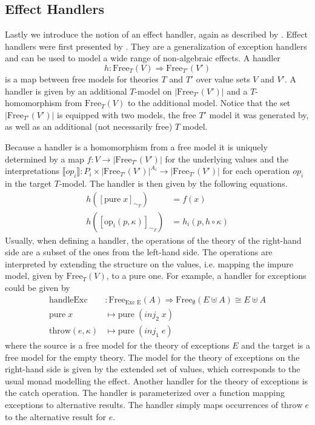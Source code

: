 \subsection{Effect Handlers}
\label{preliminaries:handler}

Lastly we introduce the notion of an effect handler, again as described by
\textcite{DBLP:journals/corr/abs-1807-05923}.
Effect handlers were first presented by \textcite{DBLP:conf/esop/PlotkinP09}.
They are a generalization of exception handlers and can be used to model a wide
range of non-algebraic effects.
A handler
\[
  h : \mathrm{Free}_{T}(V) \Rightarrow \mathrm{Free}_{T'}(V')
\]
is a map between free models for theories $T$ and $T'$ over value sets $V$ and
$V'$.
A handler is given by an additional $T$-model on $|\mathrm{Free}_{T'}(V')|$ and
a $T$-homomorphism from $\mathrm{Free}_{T}(V)$ to the additional model.
Notice that the set $|\mathrm{Free}_{T'}(V')|$ is equipped with two models, the
free $T'$ model it was generated by, as well as an additional (not necessarily
free) $T$ model.

Because a handler is a homomorphism from a free model it is uniquely determined
by a map $f : V \rightarrow |\mathrm{Free}_{T'}(V')|$ for the underlying
values and the interpretations $\lBrack op_i \rBrack : P_i \times
|\mathrm{Free}_{T'}(V')|^{A_i} \rightarrow |\mathrm{Free}_{T'}(V')|$ for each
operation $op_i$ in the target $T$-model.
The handler is then given by the following equations.
\begin{align*}
  h([\mathrm{pure}\;x]_{\sim_T}) &= f(x) \\
  h([\mathrm{op}_i(p,\kappa)]_{\sim_T}) &= h_i(p, h\circ\kappa )
\end{align*}
Usually, when defining a handler, the operations of the theory of the right-hand
side are a subset of the ones from the left-hand side.
The operations are interpreted by extending the structure on the values, i.e.
mapping the impure model, given by $\mathrm{Free}_T(V)$, to a pure one.
For example, a handler for exceptions could be given by
\begin{align*}
  \mathrm{handleExc} &: \mathrm{Free}_{\text{Exc E}}(A) \Rightarrow
  \mathrm{Free}_\emptyset(E \uplus A) \cong E \uplus A \\
  \mathrm{pure}\;x&\mapsto \mathrm{pure}\; (inj_2\; x) \\
  \mathrm{throw}(e, \kappa)&\mapsto \mathrm{pure}\; (inj_1\; e) 
\end{align*}
where the source is a free model for the theory of exceptions $E$ and the target
is a free model for the empty theory.
The model for the theory of exceptions on the right-hand side is given by the
extended set of values, which corresponds to the usual monad modelling the
effect.
Another handler for the theory of exceptions is the $\mathrm{catch}$ operation.
The handler is parameterized over a function mapping exceptions to alternative
results.
The handler simply maps occurrences of $\mathrm{throw}\;e$ to the alternative
result for $e$.

